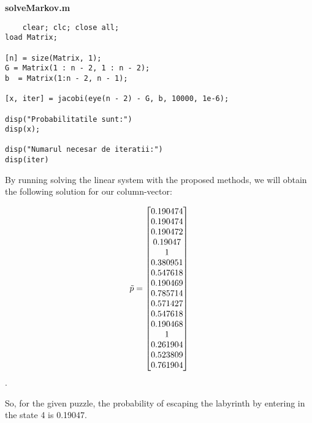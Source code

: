 \documentclass{article}
\begin{document}
\textbf{solveMarkov.m}
    \begin{lstlisting}
    clear; clc; close all;
load Matrix;

[n] = size(Matrix, 1);
G = Matrix(1 : n - 2, 1 : n - 2);
b  = Matrix(1:n - 2, n - 1);

[x, iter] = jacobi(eye(n - 2) - G, b, 10000, 1e-6);

disp("Probabilitatile sunt:")
disp(x);

disp("Numarul necesar de iteratii:")
disp(iter)
    \end{lstlisting}  

By running solving the linear system with the proposed methods, we will obtain the following solution for our column-vector:

\setcounter{MaxMatrixCols}{20}
$$\Tilde{p}=\begin{bmatrix}


0.190474\\0.190474\\0.190472
                 \\0.19047
                       \\1
                \\0.380951
                \\0.547618
                \\0.190469
                \\0.785714
                \\0.571427
                \\0.547618
                \\0.190468
                       \\1
                \\0.261904
                \\0.523809
                \\0.761904
\end{bmatrix}$$.

    So, for the given puzzle, the probability of escaping the labyrinth by entering in the state 4 is 0.19047.
\end{document}
